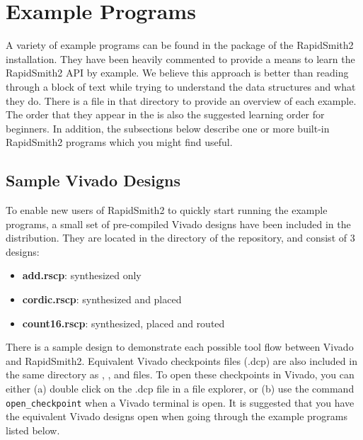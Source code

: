 \newpage
\section{Example Programs} \label{examples}
\graphicspath{{./techReportFigures/sec9_examples/}}

A variety of example programs can be found in the
 package of the RapidSmith2 installation.
They have been heavily commented to provide a means to learn the RapidSmith2 API by
example. We believe this approach is better than reading through a block of
text while trying to understand the data structures and what they do.
There is a  file in that directory to provide an overview of
each example. The order that they appear in the  is also the
suggested learning order for beginners. In addition, the subsections below
describe one or more built-in RapidSmith2 programs which you might find useful.

\subsection{Sample Vivado Designs}
To enable new users of RapidSmith2 to quickly start running the example
programs, a small set of pre-compiled Vivado designs have been included in the
distribution. They are located in the  directory of
the repository, and consist of 3 designs: 
\begin{itemize}
\item \textbf{add.rscp}: synthesized only
\item \textbf{cordic.rscp}: synthesized and placed
\item \textbf{count16.rscp}: synthesized, placed and routed
\end{itemize} 
There is a sample design to demonstrate each possible tool flow between Vivado
and RapidSmith2. Equivalent Vivado checkpoints files (.dcp) are also included in
the same directory as , , and 
files. To open these checkpoints in Vivado, you can either (a) double click on
the .dcp file in a file explorer, or (b) use the command
\texttt{open\_checkpoint} when a Vivado terminal is open. It is suggested that
you have the equivalent Vivado designs open when going through the example
programs listed below.

